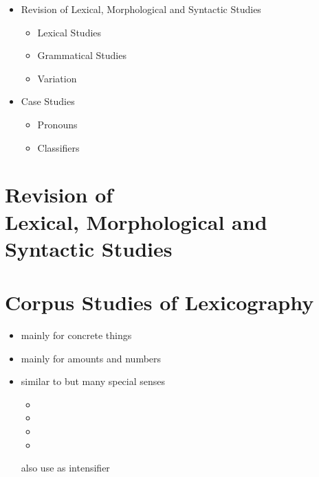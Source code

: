 \documentclass[a4paper,landscape,headrule,footrule,xetex]{foils}
\begin{document}

\maketitle
\makexeCJKactive 


\begin{itemize} 
\item Revision of Lexical, Morphological and Syntactic Studies
  \begin{itemize} 
  \item Lexical Studies
  \item Grammatical Studies
  \item Variation
  \end{itemize}
\item Case Studies
  \begin{itemize}
  \item Pronouns
  \item Classifiers
  \end{itemize}
\end{itemize}


\section{Revision of \\
Lexical, Morphological and Syntactic Studies}

\section{Corpus Studies of Lexicography}

\begin{itemize}
\item {}  mainly for concrete things
\item {}  mainly for amounts and numbers
\item {} similar to  but many special senses
  \begin{itemize}
  \item {}  
  \item {}  
  \item {}
  \item {} 
  \end{itemize}
also use as intensifier 
\end{itemize}
\end{document}

